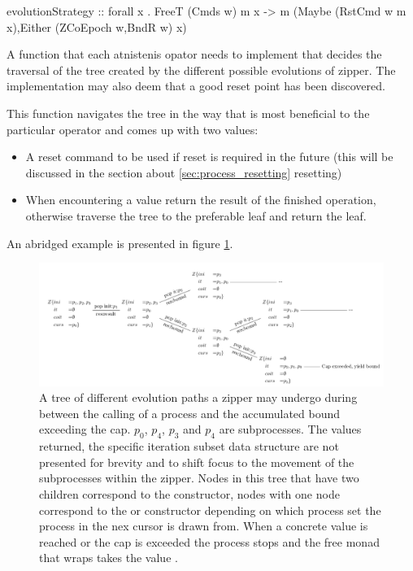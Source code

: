 \begin{code}
\begin{haskellcode}
evolutionStrategy
  :: forall x .
  FreeT (Cmds w) m x
  -> m (Maybe (RstCmd w m x),Either (ZCoEpoch w,BndR w) x)
\end{haskellcode}
  \caption{\label{lst:evolution_strategy}A function that each
    atnistenis opator needs to implement that decides the traversal of
    the tree created by the different possible evolutions of
    zipper. The implementation may also deem that a good reset point
    has been discovered.}
\end{code}

This function navigates the tree in the way that is most beneficial to
the particular operator and comes up with two values:

\begin{itemize}
\item A reset command to be used if reset is required in the future
  (this will be discussed in the section about
  \ref{sec:process_resetting} resetting)
\item When encountering a  value return the result of the
finished operation, otherwise traverse the tree to the preferable
leaf and return the leaf.
\end{itemize}

An abridged example is presented in figure \ref{fig:cmds_tree}.

\begin{figure}[H]
\centering
\includegraphics[width=\textwidth]{./imgs/cmds_tree.pdf}
\caption{\label{fig:cmds_tree}A tree of different evolution paths a
  zipper may undergo during between the calling of a process and the
  accumulated bound exceeding the cap. \(p_0\), \(p_4\), \(p_3\) and
  \(p_4\) are subprocesses. The values returned, the specific
  iteration subset data structure are not presented for brevity and to
  shift focus to the movement of the subprocesses within the
  zipper. Nodes in this tree that have two children correspond to the
   constructor, nodes with one node correspond to the
   or  constructor depending on which
  process set the process in the nex cursor is drawn from. When a
  concrete value is reached or the cap is exceeded the process stops
  and the free monad that wraps  takes the value
  .}
\end{figure}

